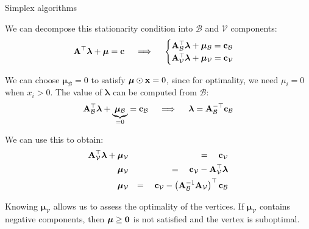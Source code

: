\documentclass[11pt,compress,t,notes=noshow, xcolor=table]{beamer}
\begin{document}
\begin{vbframe}{Simplex algorithms}

We can decompose this stationarity condition into $\mathcal{B}$ and $\mathcal{V}$ components:
$$
\mathbf{A}^\top \bm{\lambda} + \bm{\mu} = \mathbf{c} 
\quad \implies \quad
\begin{cases}
    \mathbf{A}_{\mathcal{B}}^\top \bm{\lambda} + \bm{\mu}_{\mathcal{B}} = \mathbf{c}_{\mathcal{B}} \\
    \mathbf{A}_{\mathcal{V}}^\top \bm{\lambda} + \bm{\mu}_{\mathcal{V}} = \mathbf{c}_{\mathcal{V}}
\end{cases}
$$

\framebreak

We can choose $ \bm{\mu}_{\mathcal{B}} = 0 $ to satisfy $\bm{\mu} \odot \mathbf{x} = 0$, since for optimality, we need $\mu_i=0$ when $x_i > 0$. 
The value of $ \bm{\lambda} $ can be computed from $ \mathcal{B} $:
$$
\mathbf{A}_{\mathcal{B}}^\top \bm{\lambda} + \underbrace{\bm{\mu}_{\mathcal{B}}}_{= 0} = \mathbf{c}_{\mathcal{B}} \quad \implies \quad \bm{\lambda} = \mathbf{A}_{\mathcal{B}}^{-\top} \mathbf{c}_{\mathcal{B}}
$$

We can use this to obtain:
\begin{eqnarray*}
\mathbf{A}_{\mathcal{V}}^\top \bm{\lambda} + \bm{\mu}_{\mathcal{V}} &&=\quad \mathbf{c}_{\mathcal{V}}\\
\bm{\mu}_{\mathcal{V}} &&=\quad \mathbf{c}_{\mathcal{V}} - \mathbf{A}_{\mathcal{V}}^\top \bm{\lambda}\\
\bm{\mu}_{\mathcal{V}} &&=\quad \mathbf{c}_{\mathcal{V}} - \left( \mathbf{A}_{\mathcal{B}}^{-1} \mathbf{A}_{\mathcal{V}} \right)^\top \mathbf{c}_{\mathcal{B}}
\end{eqnarray*}

\lz

Knowing $ \bm{\mu}_{\mathcal{V}} $ allows us to assess the optimality of the vertices. 
If $ \bm{\mu}_{\mathcal{V}} $ contains negative components, then $\bm{\mu} \ge \mathbf{0}$ is not satisfied and the vertex is suboptimal.

\framebreak


\end{vbframe}
\end{document}

